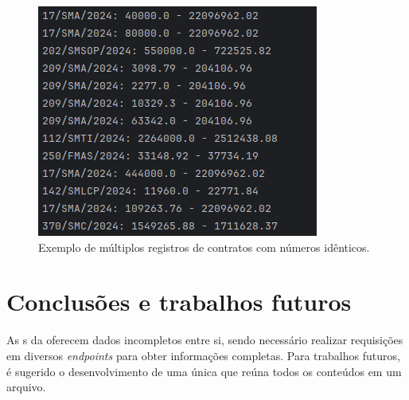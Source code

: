 \documentclass[
	12pt,				%
	oneside,			%
	a4paper,			%
	chapter=TITLE,		%
	section=TITLE,		%
	english,			%
	brazil				%
	]{abntex2}
\begin{document}
\begin{figure}[h]
	\begin{center}
		\caption{\label{fig:contratos_repetidos}Exemplo de múltiplos registros de contratos com números idênticos.}
		\includegraphics{images/contratos_numeros_repetidos.png} %
	\end{center}
\end{figure}

\chapter{Conclusões e trabalhos futuros}
\label{cap:Conclusoes}

As s da  oferecem dados incompletos entre si, sendo necessário realizar requisições em diversos \textit{endpoints} para obter informações completas. Para trabalhos futuros, é sugerido o desenvolvimento de uma única  que reúna todos os conteúdos em um arquivo.

\postextual

\begingroup
    \SingleSpacing\printbibliography[title=REFERÊNCIAS]
\endgroup

%
%
\end{document}
